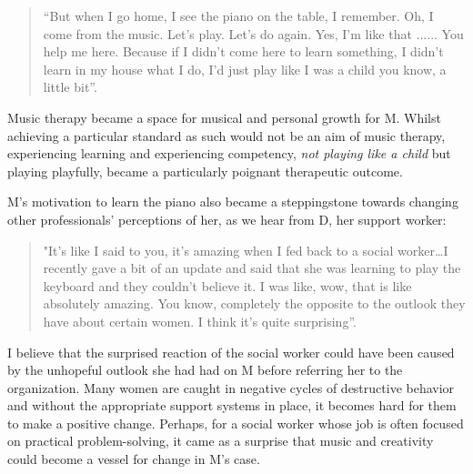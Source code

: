 \documentclass[authordate, empirical]{jote-new-article}
\begin{document}
\begin{quote}
  “But when I go home, I see the piano on the table, I remember. Oh, I come from the music. Let's play. Let's do again. Yes, I'm like that ...... You help me here. Because if I didn't come here to learn something, I didn't learn in my house what I do, I'd just play like I was a child you know, a little bit”. 
\end{quote}







Music therapy became a space for musical and personal growth for M. Whilst achieving a particular standard as such would not be an aim of music therapy, experiencing learning and experiencing competency,\emph{ not playing like a child }but playing playfully, became a particularly poignant therapeutic outcome.







M's motivation to learn the piano also became a steppingstone towards changing other professionals' perceptions of her, as we hear from D, her support worker:







\begin{quote}
  "It's like I said to you, it's amazing when I fed back to a social worker…I recently gave a bit of an update and said that she was learning to play the keyboard and they couldn't believe it. I was like, wow, that is like absolutely amazing. You know, completely the opposite to the outlook they have about certain women. I think it's quite surprising”.
\end{quote}







I believe that the surprised reaction of the social worker could have been caused by the unhopeful outlook she had had on M before referring her to the organization. Many women are caught in negative cycles of destructive behavior and without the appropriate support systems in place, it becomes hard for them to make a positive change. Perhaps, for a social worker whose job is often focused on practical problem-solving, it came as a surprise that music and creativity could become a vessel for change in M's case.
\end{document}
